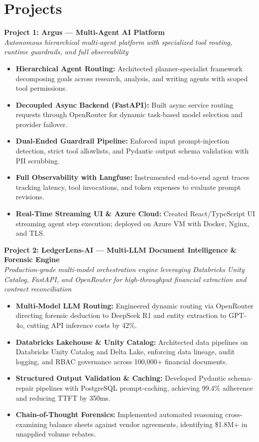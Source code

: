 \documentclass[a4paper,10pt]{article}
\begin{document}
\section{Projects}

\noindent
\textbf{\color{projecttitle}Project 1: Argus — Multi-Agent AI Platform} \\
\textit{\small Autonomous hierarchical multi-agent platform with specialized tool routing, runtime guardrails, and full observability}
\begin{itemize}
    \item \textbf{Hierarchical Agent Routing:} Architected planner-specialist framework decomposing goals across research, analysis, and writing agents with scoped tool permissions.
    \item \textbf{Decoupled Async Backend (FastAPI):} Built async service routing requests through OpenRouter for dynamic task-based model selection and provider failover.
    \item \textbf{Dual-Ended Guardrail Pipeline:} Enforced input prompt-injection detection, strict tool allowlists, and Pydantic output schema validation with PII scrubbing.
    \item \textbf{Full Observability with Langfuse:} Instrumented end-to-end agent traces tracking latency, tool invocations, and token expenses to evaluate prompt revisions.
    \item \textbf{Real-Time Streaming UI \& Azure Cloud:} Created React/TypeScript UI streaming agent step execution; deployed on Azure VM with Docker, Nginx, and TLS.
\end{itemize}

\vspace{6pt}

\noindent
\textbf{\color{projecttitle}Project 2: LedgerLens-AI — Multi-LLM Document Intelligence \& Forensic Engine} \\
\textit{\small Production-grade multi-model orchestration engine leveraging Databricks Unity Catalog, FastAPI, and OpenRouter for high-throughput financial extraction and contract reconciliation}
\begin{itemize}
    \item \textbf{Multi-Model LLM Routing:} Engineered dynamic routing via OpenRouter directing forensic deduction to DeepSeek R1 and entity extraction to GPT-4o, cutting API inference costs by 42\%.
    \item \textbf{Databricks Lakehouse \& Unity Catalog:} Architected data pipelines on Databricks Unity Catalog and Delta Lake, enforcing data lineage, audit logging, and RBAC governance across 100,000+ financial documents.
    \item \textbf{Structured Output Validation \& Caching:} Developed Pydantic schema-repair pipelines with PostgreSQL prompt-caching, achieving 99.4\% adherence and reducing TTFT by 350ms.
    \item \textbf{Chain-of-Thought Forensics:} Implemented automated reasoning cross-examining balance sheets against vendor agreements, identifying \$1.8M+ in unapplied volume rebates.
\end{itemize}
\end{document}
